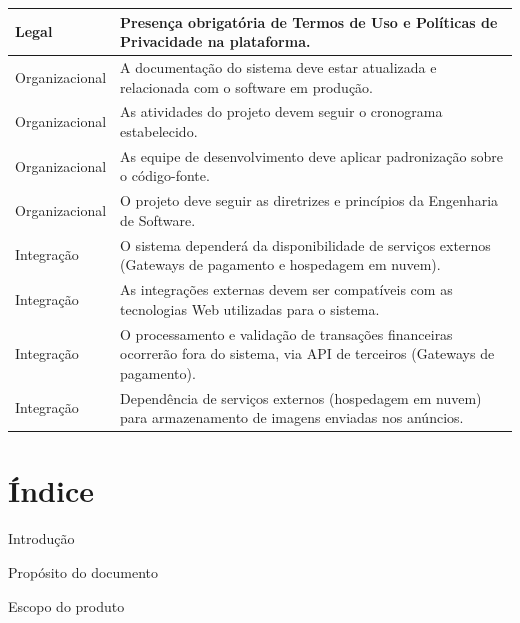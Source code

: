\documentclass[
	article,			%
	11pt,				%
	oneside,			%
	a4paper,			%
	english,			%
	brazil,				%
	sumario=tradicional
	]{abntex2}
\begin{document}
\begin{longtable}{|l|p{10cm}|}
Legal & Presença obrigatória de Termos de Uso e Políticas de Privacidade na plataforma. \\
\hline

Organizacional & A documentação do sistema deve estar atualizada e relacionada com o software em produção. \\
\hline

Organizacional & As atividades do projeto devem seguir o cronograma estabelecido. \\
\hline

Organizacional & As equipe de desenvolvimento deve aplicar padronização sobre o código-fonte. \\
\hline

Organizacional & O projeto deve seguir as diretrizes e princípios da Engenharia de Software. \\
\hline

Integração & O sistema dependerá da disponibilidade de serviços externos (Gateways de pagamento e hospedagem em nuvem). \\
\hline

Integração & As integrações externas devem ser compatíveis com as tecnologias Web utilizadas para o sistema. \\
\hline

Integração & O processamento e validação de transações financeiras ocorrerão fora do sistema, via API de terceiros (Gateways de pagamento). \\
\hline

Integração & Dependência de serviços externos (hospedagem em nuvem) para armazenamento de imagens enviadas nos anúncios. \\
\hline

\end{longtable}



\clearpage
\section{Índice}
\label{Indice}

Introdução\dotfill \pageref{sec:Introducao}

\hspace{1cm}Propósito do documento\dotfill \pageref{sec:Proposito}

\hspace{1cm}Escopo do produto\dotfill \pageref{sec:Escopo}
\end{document}
